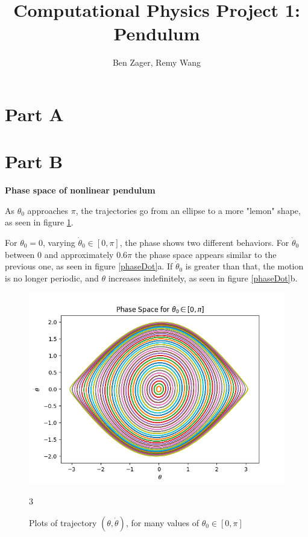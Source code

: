 \documentclass[12pt]{article}
\newenvironment{problem}[2][]{\begin{trivlist}
\item[\hskip \labelsep {\bfseries #1}\hskip \labelsep {\bfseries #2.}]}{\end{trivlist}}
\begin{document}
  
\title{Computational Physics Project 1: Pendulum}
\author{Ben Zager, Remy Wang}
\maketitle

\section*{Part A}



\section*{Part B}
\begin{problem}{1}
	\textbf{Phase space of nonlinear pendulum}

	As $\theta_{0}$ approaches $\pi$, the trajectories go from an ellipse to a more "lemon" shape, as seen in figure \ref{phase}.

	For $\theta_{0} = 0$, varying $\dot{\theta}_{0} \in [0,\pi]$, the phase shows two different behaviors.  For $\dot{\theta}_{0}$ between 0 and approximately $0.6\pi$ the phase space appears similar to the previous one, as seen in figure \ref{phaseDot}a.  If $\dot{\theta}_{0}$ is greater than that, the motion is no longer periodic, and $\theta$ increases indefinitely, as seen in figure \ref{phaseDot}b.

\begin{figure}[ht!]
	\centering
	\includegraphics[scale=0.6]{../figures/phaseSpace.png}
	\caption{Plots of trajectory $(\theta,\dot{\theta})$, for many values of $\theta_{0} \in [0,\pi]$}
	3\label{phase}
\end{figure}


\end{problem}
\end{document}
